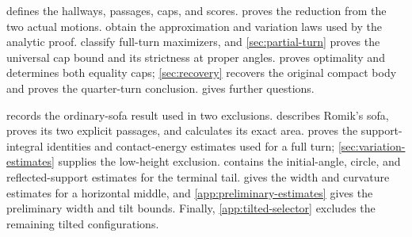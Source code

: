  defines the hallways, passages, caps, and scores.
 proves the reduction from the two actual motions.
 obtain the approximation and
variation laws used by the analytic proof. 
classify full-turn maximizers, and \cref{sec:partial-turn} proves the
universal cap bound and its strictness at proper angles.
 proves optimality and determines both equality
caps; \cref{sec:recovery} recovers the original compact body and proves
the quarter-turn conclusion.  gives further questions.

 records the ordinary-sofa result used in
two exclusions.  describes Romik's sofa, proves its
two explicit passages, and calculates its exact area.
 proves the support-integral identities
and contact-energy estimates used for a full turn;
\cref{sec:variation-estimates} supplies the low-height exclusion.
 contains the initial-angle, circle,
and reflected-support estimates for the terminal tail.
 gives the width and curvature estimates
for a horizontal middle, and \cref{app:preliminary-estimates} gives
the preliminary width and tilt bounds. Finally,
\cref{app:tilted-selector} excludes the remaining tilted configurations.
